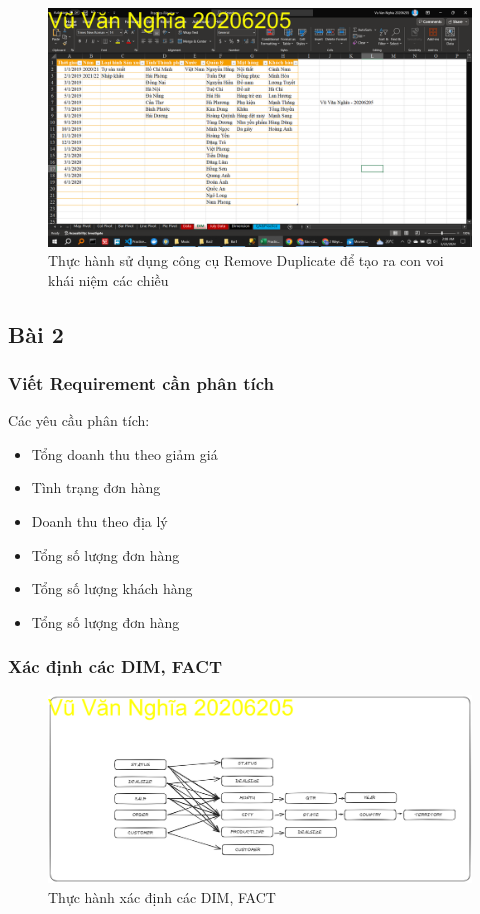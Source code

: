 \documentclass{article}
\begin{document}
\begin{itemize}
\begin{figure}[H]
\centering
\includegraphics[scale = 0.15]{Bai1/ThucHanh/VOI.png}
\caption{Thực hành sử dụng công cụ Remove Duplicate để tạo ra con voi khái niệm các chiều}
\end{figure}

\end{itemize}

\subsection{Bài 2}

\subsubsection{Viết Requirement cần phân tích}
Các yêu cầu phân tích:

\begin{itemize}
\item Tổng doanh thu theo giảm giá
\item Tình trạng đơn hàng
\item Doanh thu theo địa lý
\item Tổng số lượng đơn hàng
\item Tổng số lượng khách hàng
\item Tổng số lượng đơn hàng
\end{itemize}

\subsubsection{Xác định các DIM, FACT}

\begin{figure}[H]
\centering
\includegraphics[scale = 0.15]{Bai2/ThucHanh/DIM-FACT.png}
\caption{Thực hành xác định các DIM, FACT}
\end{figure}
\end{document}
